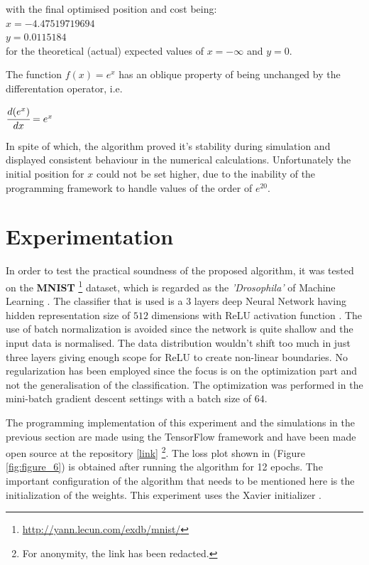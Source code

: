 \documentclass{article}
\begin{document}
with the final optimised position and cost being:\\
$x = -4.47519719694$\\
$y = 0.0115184$\\

for the theoretical (actual) expected values of $x = -\infty$ and $y = 0$.

The function $f(x) = e^x$ has an oblique property of being unchanged by the differentation operator, i.e. 
\begin{center}
	$\cfrac{d(e^x)}{dx} = e^x$
\end{center}
In spite of which, the algorithm proved it's stability during simulation and displayed consistent behaviour in the numerical calculations. Unfortunately the initial position for $x$ could not be set higher, due to the inability of the programming framework to handle values of the order of $e^{20}$.

\section{Experimentation}
In order to test the practical soundness of the proposed algorithm, it was tested on the \textbf{MNIST} \footnote{\url{http://yann.lecun.com/exdb/mnist/}} dataset, which is regarded as the \textit{'Drosophila'} of Machine Learning \cite{goodfellow-et-al:deep-learning}. The classifier that is used is a $3$ layers deep Neural Network having hidden representation size of $512$ dimensions with ReLU activation function \cite{nair:relu}. The use of batch normalization \cite{ioffe:batch-normalization} is avoided since the network is quite shallow and the input data is normalised. The data distribution wouldn’t shift too much in just three layers giving enough scope for ReLU to create non-linear boundaries. No regularization has been employed since the focus is on the optimization part and not the generalisation of the classification. The optimization was performed in the mini-batch gradient descent settings with a batch size of $64$.

The programming implementation of this experiment and the simulations in the previous section are made using the TensorFlow framework \cite{abadi:tensorflow} and have been made open source at the repository [\url{link}] \footnote{For anonymity, the link has been redacted.}. The loss plot shown in (Figure \ref{fig:figure_6}) is obtained after running the algorithm for 12 epochs. The important configuration of the algorithm that needs to be mentioned here is the initialization of the weights. This experiment uses the Xavier initializer \cite{glorot:xavier}.
\end{document}

